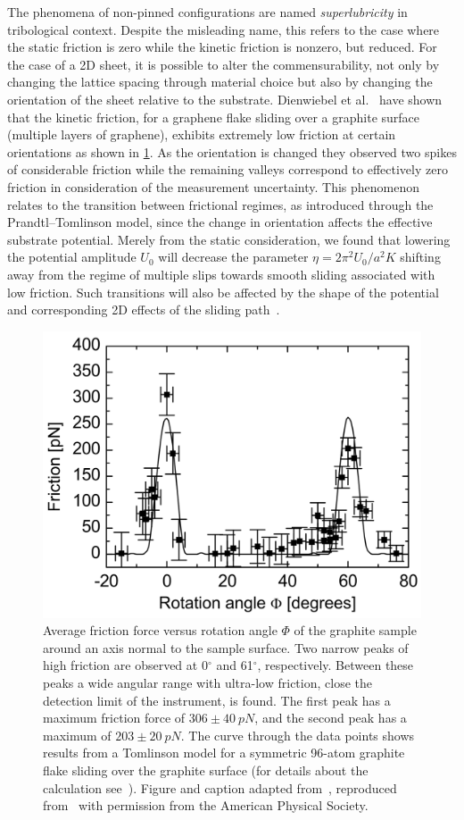 The phenomena of non-pinned configurations are named \textit{superlubricity} in
tribological context. Despite the misleading name, this refers to the case where
the static friction is zero while the kinetic friction is nonzero, but reduced.
For the case of a 2D sheet, it is possible to alter the commensurability, not
only by changing the lattice spacing through material choice but also by
changing the orientation of the sheet relative to the substrate. Dienwiebel et
al.~\cite{DIENWIEBEL2005197} have shown that the kinetic friction, for a
graphene flake sliding over a graphite surface (multiple layers of graphene),
exhibits extremely low friction at certain orientations as shown in
\cref{fig:graphene_rot}. As the orientation is changed they observed two spikes
of considerable friction while the remaining valleys correspond to effectively
zero friction in consideration of the measurement uncertainty. This phenomenon
relates to the transition between frictional regimes, as introduced through the
Prandtl–Tomlinson model, since the change in orientation affects the effective
substrate potential. Merely from the static consideration, we found that
lowering the potential amplitude $U_0$ will decrease the parameter $\eta =
2\pi^2U_0/a^2K$ shifting away from the regime of multiple slips towards smooth
sliding associated with low friction. Such transitions will also be affected by
the shape of the potential and corresponding 2D effects of the sliding
path~\cite{Yalin_2011}.

\begin{figure}[!htb]
  \centering
  \includegraphics[width=0.55\linewidth]{figures/theory/graphene_rot.png}
  \caption{Average friction force versus rotation angle $\Phi$ of the
  graphite sample around an axis normal to the sample surface.
  Two narrow peaks of high friction are observed at 0$^{\circ}$ and 61$^{\circ}$,
  respectively. Between these peaks a wide angular range with
  ultra-low friction, close the detection limit of the instrument, is
  found. The first peak has a maximum friction force of $306 \pm \SI{40}{pN}$, and the second peak has a maximum of $203 \pm \SI{20}{pN}$.
  The curve through the data points shows results from a
  Tomlinson model for a symmetric 96-atom graphite flake
  sliding over the graphite surface (for details about the calculation see~\cite{PhysRevB.70.165418}). Figure and caption adapted from~\cite{DIENWIEBEL2005197}, reproduced from~\cite{Vanossi_2013} with permission from the American Physical Society.}
  \label{fig:graphene_rot}
\end{figure}






